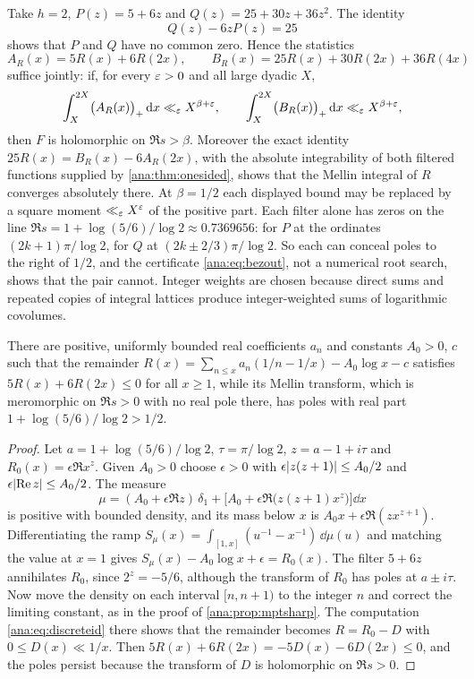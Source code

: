 \begin{example}\label{ana:ex:filters}
Take $h=2$, $P(z)=5+6z$ and $Q(z)=25+30z+36z^2$. The identity
\begin{equation}\label{ana:eq:bezout}
 Q(z)-6zP(z)=25
\end{equation}
shows that $P$ and $Q$ have no common zero. Hence the statistics
\[
 A_R(x)=5R(x)+6R(2x),\qquad B_R(x)=25R(x)+30R(2x)+36R(4x)
\]
suffice jointly: if, for every $\varepsilon>0$ and all large dyadic $X$,
\[
 \int_X^{2X}\bigl(A_R(x)\bigr)_{+}\,\mathrm{d} x\ll_\varepsilon X^{\beta+\varepsilon},\qquad
 \int_X^{2X}\bigl(B_R(x)\bigr)_{+}\,\mathrm{d} x\ll_\varepsilon X^{\beta+\varepsilon},
\]
then $F$ is holomorphic on $\Re s>\beta$. Moreover the exact identity
$25R(x)=B_R(x)-6A_R(2x)$, with the absolute integrability of both filtered functions supplied
by \cref{ana:thm:onesided}, shows that the Mellin integral of $R$ converges absolutely there. At
$\beta=1/2$ each displayed bound may be replaced by a square moment $\ll_\varepsilon X^{\varepsilon}$ of the
positive part. Each filter alone has zeros on the line
$\Re s=1+\log(5/6)/\log2\approx0.7369656$: for $P$ at the ordinates $(2k+1)\pi/\log2$, for $Q$
at $(2k\pm2/3)\pi/\log2$. So each can conceal poles to the right of $1/2$, and the certificate
\eqref{ana:eq:bezout}, not a numerical root search, shows that the pair cannot. Integer
weights are chosen because direct sums and repeated copies of integral lattices produce
integer-weighted sums of logarithmic covolumes.
\end{example}

\begin{proposition}\label{ana:prop:onefilter}
There are positive, uniformly bounded real coefficients $a_n$ and constants $A_0>0$, $c$ such
that the remainder $R(x)=\sum_{n\le x}a_n(1/n-1/x)-A_0\log x-c$ satisfies $5R(x)+6R(2x)\le0$
for all $x\ge1$, while its Mellin transform, which is meromorphic on $\Re s>0$ with no real pole
there, has poles with real part $1+\log(5/6)/\log2>1/2$.
\end{proposition}

\begin{proof}
Let $a=1+\log(5/6)/\log2$, $\tau=\pi/\log2$, $z=a-1+i\tau$ and $R_0(x)=\epsilon\Re x^z$. Given
$A_0>0$ choose $\epsilon>0$ with $\epsilon\lvert z(z+1)\rvert\le A_0/2$ and
$\epsilon\lvert\operatorname{Re} z\rvert\le A_0/2$. The measure
\[
 \mu=(A_0+\epsilon\Re z)\,\delta_1
 +\bigl[A_0+\epsilon\Re\bigl(z(z+1)x^z\bigr)\bigr]\dd x
\]
is positive with bounded density, and its mass below $x$ is $A_0x+\epsilon\Re(zx^{z+1})$.
Differentiating the ramp $S_\mu(x)=\int_{[1,x]}(u^{-1}-x^{-1})\,\dd\mu(u)$ and matching the
value at $x=1$ gives $S_\mu(x)-A_0\log x+\epsilon=R_0(x)$. The filter $5+6z$ annihilates $R_0$,
since $2^{z}=-5/6$, although the transform of $R_0$ has poles at $a\pm i\tau$. Now move the
density on each interval $[n,n+1)$ to the integer $n$ and correct the limiting constant, as in
the proof of \cref{ana:prop:mptsharp}. The computation \eqref{ana:eq:discreteid} there shows that
the remainder becomes $R=R_0-D$ with $0\le D(x)\ll1/x$. Then $5R(x)+6R(2x)=-5D(x)-6D(2x)\le0$,
and the poles persist because the transform of $D$ is holomorphic on $\Re s>0$.
\end{proof}

